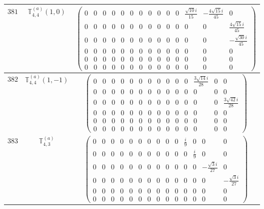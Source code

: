 \documentclass[fleqn,8pt,landscape]{jsarticle}
\begin{document}
\begin{center}
\begin{longtable}{ccc}
$ 381 $ & $ \mathbb{T}_{4,4}^{(a)}(1,0) $ & $ \begin{pmatrix} 0 & 0 & 0 & 0 & 0 & 0 & 0 & 0 & 0 & 0 & 0 & \frac{\sqrt{10} i}{15} & - \frac{4 \sqrt{15} i}{45} & 0 \\ 0 & 0 & 0 & 0 & 0 & 0 & 0 & 0 & 0 & 0 & 0 & 0 & 0 & \frac{4 \sqrt{15} i}{45} \\ 0 & 0 & 0 & 0 & 0 & 0 & 0 & 0 & 0 & 0 & 0 & 0 & 0 & - \frac{\sqrt{30} i}{45} \\ 0 & 0 & 0 & 0 & 0 & 0 & 0 & 0 & 0 & 0 & 0 & 0 & 0 & 0 \\ 0 & 0 & 0 & 0 & 0 & 0 & 0 & 0 & 0 & 0 & 0 & 0 & 0 & 0 \\ 0 & 0 & 0 & 0 & 0 & 0 & 0 & 0 & 0 & 0 & 0 & 0 & 0 & 0 \end{pmatrix} $ \\ \hline
$ 382 $ & $ \mathbb{T}_{4,4}^{(a)}(1,-1) $ & $ \begin{pmatrix} 0 & 0 & 0 & 0 & 0 & 0 & 0 & 0 & 0 & 0 & 0 & \frac{3 \sqrt{14} i}{28} & 0 & 0 \\ 0 & 0 & 0 & 0 & 0 & 0 & 0 & 0 & 0 & 0 & 0 & 0 & 0 & 0 \\ 0 & 0 & 0 & 0 & 0 & 0 & 0 & 0 & 0 & 0 & 0 & 0 & 0 & \frac{3 \sqrt{42} i}{28} \\ 0 & 0 & 0 & 0 & 0 & 0 & 0 & 0 & 0 & 0 & 0 & 0 & 0 & 0 \\ 0 & 0 & 0 & 0 & 0 & 0 & 0 & 0 & 0 & 0 & 0 & 0 & 0 & 0 \\ 0 & 0 & 0 & 0 & 0 & 0 & 0 & 0 & 0 & 0 & 0 & 0 & 0 & 0 \end{pmatrix} $ \\ \hline
$ 383 $ & $ \mathbb{T}_{4,3}^{(a)} $ & $ \begin{pmatrix} 0 & 0 & 0 & 0 & 0 & 0 & 0 & 0 & 0 & 0 & \frac{i}{9} & 0 & 0 & 0 \\ 0 & 0 & 0 & 0 & 0 & 0 & 0 & 0 & 0 & 0 & 0 & \frac{i}{9} & 0 & 0 \\ 0 & 0 & 0 & 0 & 0 & 0 & 0 & 0 & 0 & 0 & 0 & 0 & - \frac{\sqrt{3} i}{27} & 0 \\ 0 & 0 & 0 & 0 & 0 & 0 & 0 & 0 & 0 & 0 & 0 & 0 & 0 & - \frac{\sqrt{3} i}{27} \\ 0 & 0 & 0 & 0 & 0 & 0 & 0 & 0 & 0 & 0 & 0 & 0 & 0 & 0 \\ 0 & 0 & 0 & 0 & 0 & 0 & 0 & 0 & 0 & 0 & 0 & 0 & 0 & 0 \end{pmatrix} $ \\ \hline

\end{longtable}
\end{center}
\end{document}
